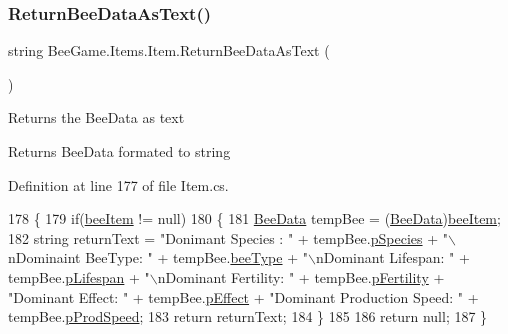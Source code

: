 \subsubsection{\texorpdfstring{Return\+Bee\+Data\+As\+Text()}{ReturnBeeDataAsText()}}
{\footnotesize\ttfamily string Bee\+Game.\+Items.\+Item.\+Return\+Bee\+Data\+As\+Text (\begin{DoxyParamCaption}{ }\end{DoxyParamCaption})}



Returns the Bee\+Data as text 

\begin{DoxyReturn}{Returns}
Bee\+Data formated to string
\end{DoxyReturn}


Definition at line 177 of file Item.\+cs.


\begin{DoxyCode}
178         \{
179             \textcolor{keywordflow}{if}(\hyperlink{struct_bee_game_1_1_items_1_1_item_a0593f3b7b3ff5daa864f3c6d0ccd77ca}{beeItem} != null)
180             \{
181                 \hyperlink{struct_bee_game_1_1_bee_1_1_bee_data}{BeeData} tempBee = (\hyperlink{struct_bee_game_1_1_bee_1_1_bee_data}{BeeData})\hyperlink{struct_bee_game_1_1_items_1_1_item_a0593f3b7b3ff5daa864f3c6d0ccd77ca}{beeItem};
182                 \textcolor{keywordtype}{string} returnText = \textcolor{stringliteral}{"Donimant Species : "} + tempBee.\hyperlink{struct_bee_game_1_1_bee_1_1_bee_data_a87db9add2bcc463ab444eb4ac7a4e228}{pSpecies} + \textcolor{stringliteral}{"\(\backslash\)nDominaint
       BeeType: "} + tempBee.\hyperlink{struct_bee_game_1_1_bee_1_1_bee_data_acfb6e209ae7bd1b52928580fcce4c743}{beeType} + \textcolor{stringliteral}{"\(\backslash\)nDominant Lifespan: "} + tempBee.\hyperlink{struct_bee_game_1_1_bee_1_1_bee_data_aa24b1efdb25e8c5592d88940f9afc1e9}{pLifespan} + \textcolor{stringliteral}{"\(\backslash\)nDominant Fertility:
       "} + tempBee.\hyperlink{struct_bee_game_1_1_bee_1_1_bee_data_a12b5a0d54c6c9162a69a88c349b044d1}{pFertility} + \textcolor{stringliteral}{"Dominant Effect: "} + tempBee.\hyperlink{struct_bee_game_1_1_bee_1_1_bee_data_a652a963fb73f2a096a001d817c0ef2be}{pEffect} + \textcolor{stringliteral}{"Dominant Production
       Speed: "} + tempBee.\hyperlink{struct_bee_game_1_1_bee_1_1_bee_data_a8fa39d271a23500ad826041b46d9feaf}{pProdSpeed};
183                 \textcolor{keywordflow}{return} returnText;
184             \}
185 
186             \textcolor{keywordflow}{return} null;
187         \}
\end{DoxyCode}
\mbox{\label{struct_bee_game_1_1_items_1_1_item_a80c66aa30f64c498640a4b0ba1ec37b0}} 
